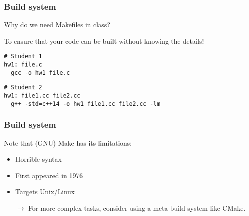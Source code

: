 \documentclass[12pt,t]{beamer}
\newcommand{\conclude}[1]{%
  \begin{itemize}
    \item[$\rightarrow$]#1
  \end{itemize}
}
\begin{document}
  \begin{frame}[fragile]
    \frametitle{Build system}

    Why do we need Makefiles in class?

    To ensure that your code can be built without knowing the details!

    \begin{lstlisting}[frame=single]
# Student 1
hw1: file.c
  gcc -o hw1 file.c
    \end{lstlisting}

    \begin{lstlisting}[frame=single]
# Student 2
hw1: file1.cc file2.cc
  g++ -std=c++14 -o hw1 file1.cc file2.cc -lm
    \end{lstlisting}
  \end{frame}

  \begin{frame}[fragile]
    \frametitle{Build system}

    Note that (GNU) Make has its limitations:
    \begin{itemize}
      \item Horrible syntax
      \item First appeared in 1976
      \item Targets Unix/Linux
    \end{itemize}

    \conclude{For more complex tasks, consider using a meta build system like CMake.}
  \end{frame}
\end{document}

